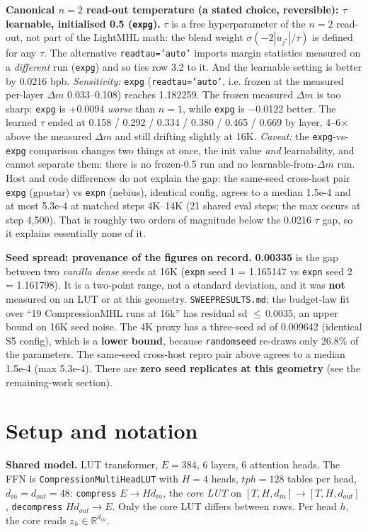 \documentclass[10pt]{article}
\newcommand{\code}[1]{{\renewcommand{\_}{\textunderscore\allowbreak}\texttt{#1}}}
\begin{document}
\textbf{Canonical $n=2$ read-out temperature (a stated choice, reversible): $\tau$ learnable, initialised 0.5 (\code{exp\_g\_0195}).}
$\tau$ is a free hyperparameter of the $n=2$ read-out, not part of the LightMHL math: the blend weight $\sigma(-2|u_{j^\star}|/\tau)$ is defined for any $\tau$.
The alternative \code{read\_tau='auto'} imports margin statistics measured on a \emph{different} run (\code{exp\_g\_0193}) and so ties row 3.2 to it.
And the learnable setting is better by 0.0216 bpb.
\emph{Sensitivity:} \code{exp\_g\_0194} (\code{read\_tau='auto'}, i.e. frozen at the measured per-layer $\Delta m$ 0.033--0.108) reaches 1.182259. The frozen measured
$\Delta m$ is too sharp: \code{exp\_g\_0194} is +0.0094 \emph{worse} than $n=1$, while \code{exp\_g\_0195} is $-$0.0122 better. The learned $\tau$ ended at
0.158 / 0.292 / 0.334 / 0.380 / 0.465 / 0.669 by layer, 4--6$\times$ above the measured $\Delta m$ and still drifting slightly at 16K.
\emph{Caveat:} the \code{exp\_g\_0194}-vs-\code{exp\_g\_0195} comparison changes two things at once, the init value \emph{and} learnability, and cannot separate them:
there is no frozen-0.5 run and no learnable-from-$\Delta m$ run. Host and code differences do not explain the gap: the same-seed cross-host pair
\code{exp\_g\_0191} (gpustar) vs \code{exp\_n\_0192} (nebius), identical config, agrees to a median 1.5e-4 and at most 5.3e-4 at matched steps 4K--14K
(21 shared eval steps; the max occurs at step 4,500). That is roughly two orders of magnitude below the 0.0216 $\tau$ gap, so it explains essentially none of it.

\textbf{Seed spread: provenance of the figures on record.}
\textbf{0.00335} is the gap between two \emph{vanilla dense} seeds at 16K (\code{exp\_n\_0135} seed 1 = 1.165147 vs \code{exp\_n\_0176} seed 2 = 1.161798).
It is a two-point range, not a standard deviation, and it was \textbf{not} measured on an LUT or at this geometry.
\code{SWEEP\_RESULTS.md}: the budget-law fit over ``19 CompressionMHL runs at 16k'' has residual sd $\le$\,0.0035, an upper bound on 16K seed noise.
The 4K proxy has a three-seed sd of 0.009642 (identical S5 config), which is a \textbf{lower bound}, because \code{random\_seed} re-draws only 26.8\% of the parameters.
The same-seed cross-host repro pair above agrees to a median 1.5e-4 (max 5.3e-4). There are \textbf{zero seed replicates at this geometry} (see the remaining-work section).

\section*{Setup and notation}
\textbf{Shared model.} LUT transformer, $E=384$, 6 layers, 6 attention heads. The FFN is
\code{CompressionMultiHeadLUT} with $H=4$ heads, $tph=128$ tables per head, $d_{in}=d_{out}=48$:
\code{compress} $E\to H d_{in}$, the \emph{core LUT} on $[T,H,d_{in}]\to[T,H,d_{out}]$, \code{decompress}
$H d_{out}\to E$. Only the core LUT differs between rows. Per head $h$, the core reads $z_h\in\mathbb R^{d_{in}}$.
\end{document}
